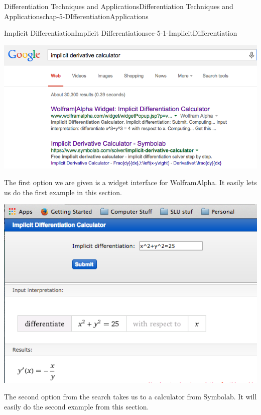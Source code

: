 \documentclass[oneside,10pt,]{book}
\numberwithin{equation}{section}
\begin{document}
\begin{chapterptx}{Differentiation Techniques and Applications}{}{Differentiation Techniques and Applications}{}{}{chap-5-DIfferentiationApplications}
\begin{sectionptx}{Implicit Differentiation}{}{Implicit Differentiation}{}{}{sec-5-1-ImplicitDifferentiation}
\begin{sidebyside}{1}{0}{0}{0}
\begin{sbspanel}{1}
\includegraphics[width=1\linewidth]{images/sec5-1-1.png}
\end{sbspanel}%
\end{sidebyside}%
\par
\hypertarget{p-1893}{}%
The first option we are given is a widget interface for WolframAlpha.  It easily lets us do the first example in this section.%
\begin{sidebyside}{1}{0.15}{0.15}{0}%
\begin{sbspanel}{0.7}%
\includegraphics[width=1\linewidth]{images/sec5-1-2.png}
\end{sbspanel}%
\end{sidebyside}%
\par
\hypertarget{p-1894}{}%
The second option from the search takes us to a calculator from Symbolab.  It will easily do the second example from this section.%
\begin{sidebyside}{1}{0.15}{0.15}{0}%
\begin{sbspanel}{0.7}%

\end{sbspanel}
\end{sidebyside}
\end{sectionptx}
\end{chapterptx}
\end{document}
